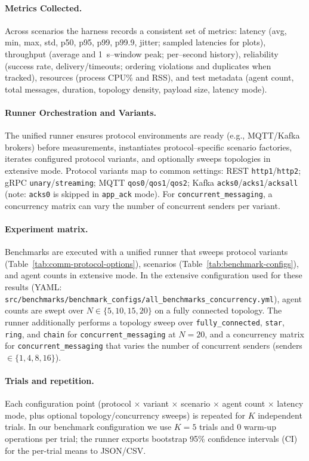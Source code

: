 \paragraph{Metrics Collected.}
Across scenarios the harness records a consistent set of metrics: latency (avg, min, max, std, p50, p95, p99, p99.9, jitter; sampled latencies for plots), throughput (average and 1~s--window peak; per--second history), reliability (success rate, delivery/timeouts; ordering violations and duplicates when tracked), resources (process CPU\% and RSS), and test metadata (agent count, total messages, duration, topology density, payload size, latency mode).

\paragraph{Runner Orchestration and Variants.}
The unified runner ensures protocol environments are ready (e.g., MQTT/Kafka brokers) before measurements, instantiates protocol--specific scenario factories, iterates configured protocol variants, and optionally sweeps topologies in extensive mode. Protocol variants map to common settings: REST \texttt{http1}/\texttt{http2}; gRPC \texttt{unary}/\texttt{streaming}; MQTT \texttt{qos0}/\texttt{qos1}/\texttt{qos2}; Kafka \texttt{acks0}/\texttt{acks1}/\texttt{acksall} (note: \texttt{acks0} is skipped in \texttt{app\_ack} mode). For \texttt{concurrent\_messaging}, a concurrency matrix can vary the number of concurrent senders per variant.

\paragraph{Experiment matrix.}
Benchmarks are executed with a unified runner that sweeps protocol variants (Table~\ref{tab:comm-protocol-options}), scenarios (Table~\ref{tab:benchmark-configs}), and agent counts in extensive mode. In the extensive configuration used for these results (YAML: \texttt{src/benchmarks/benchmark\_configs/all\_benchmarks\_concurrency.yml}), agent counts are swept over $N \in \{5,10,15,20\}$ on a fully connected topology. The runner additionally performs a topology sweep over \texttt{fully\_connected}, \texttt{star}, \texttt{ring}, and \texttt{chain} for \texttt{concurrent\_messaging} at $N=20$, and a concurrency matrix for \texttt{concurrent\_messaging} that varies the number of concurrent senders (senders $\in \{1,4,8,16\}$).

\paragraph{Trials and repetition.}
Each configuration point (protocol $\times$ variant $\times$ scenario $\times$ agent count $\times$ latency mode, plus optional topology/concurrency sweeps) is repeated for $K$ independent trials. In our benchmark configuration we use $K=5$ trials and 0 warm-up operations per trial; the runner exports bootstrap 95\% confidence intervals (CI) for the per-trial means to JSON/CSV.

